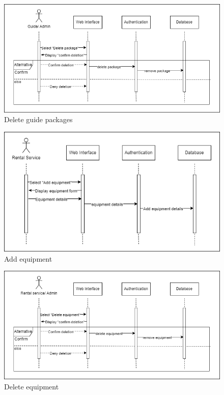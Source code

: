 \begin{figure}[h!]
    \centering
    \includegraphics[width=1\textwidth]{Images/Sequence Diagrams/Sequence diagrams-8-Delete guide package.drawio.png}
    \caption{Delete guide packages}
\end{figure}

\begin{figure}[h!]
    \centering
    \includegraphics[width=1\textwidth]{Images/Sequence Diagrams/Sequence diagrams-9-Add equipment.drawio.png}
    \caption{Add equipment}
\end{figure}

\begin{figure}[h!]
    \centering
    \includegraphics[width=1\textwidth]{Images/Sequence Diagrams/Sequence diagrams-10-Delete equipment.drawio.png}
    \caption{Delete equipment}
\end{figure}

